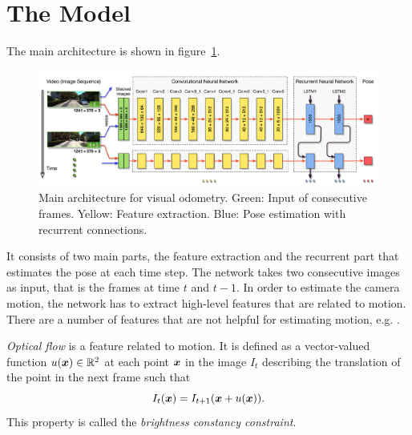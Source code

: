 	\section{The Model}
		The main architecture is shown in figure~\ref{fig:main-architecture}.
		\begin{figure}[t]
			\centering
			\includegraphics[width=\linewidth]{Images/Model/DeepVO-arch}
			\caption[Main architecture for visual odometry]
					{Main architecture for visual odometry.
					 Green: Input of consecutive frames.
					 Yellow: Feature extraction.
					 Blue: Pose estimation with recurrent connections.
					 \label{fig:main-architecture}}
		\end{figure}
		It consists of two main parts, the feature extraction and the recurrent part that estimates the pose at each time step.
		The network takes two consecutive images as input, that is the frames at time $t$ and $t - 1$.
		In order to estimate the camera motion, the network has to extract high-level features that are related to motion. 
		There are a number of features that are not helpful for estimating motion, e.g. .
		
		\emph{Optical flow} is a feature related to motion. 
		It is defined as a vector-valued function $u(\bm{x}) \in \mathbb{R}^2$ at each point $\bm{x}$ in the image $I_{t}$ describing the translation of the point in the next frame such that
		\begin{equation}
			I_{t}(\bm{x}) = I_{t + 1}(\bm{x} + u(\bm{x})).
		\end{equation}
		This property is called the \emph{brightness constancy constraint}.
		
